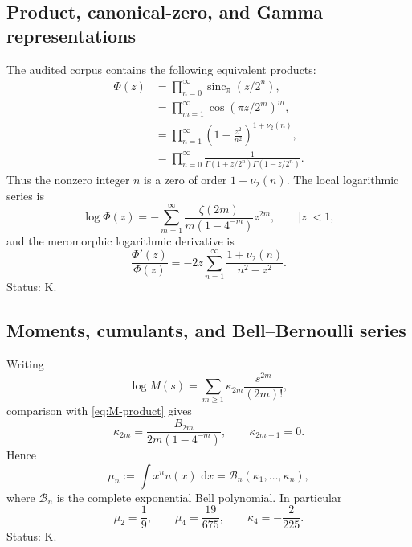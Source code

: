 \documentclass[11pt,oneside]{article}
\numberwithin{equation}{section}
\theoremstyle{definition}
\theoremstyle{remark}
\newcommand{\sincpi}{\operatorname{sinc}_{\pi}}
\newcommand{\vtwo}{\nu_2}
\newcommand{\dd}{\,\mathrm d}
\newcommand{\cB}{\mathcal B}
\newcommand{\statusknown}{\textcolor{deepviolet}{\textsf{K}}}
\begin{document}
\subsection{Product, canonical-zero, and Gamma representations}

The audited corpus contains the following equivalent products:
\begin{align}
 \Phi(z)
 &=\prod_{n=0}^{\infty}\sincpi(z/2^n),                     \label{eq:atlas-sinc}\\
 &=\prod_{m=1}^{\infty}\cos(\pi z/2^m)^m,                  \label{eq:atlas-cos}\\
 &=\prod_{n=1}^{\infty}\left(1-\frac{z^2}{n^2}\right)^{1+\vtwo(n)}, \label{eq:atlas-canonical}\\
 &=\prod_{n=0}^{\infty}
   \frac1{\Gamma(1+z/2^n)\Gamma(1-z/2^n)}.                \label{eq:atlas-gamma}
\end{align}
Thus the nonzero integer $n$ is a zero of order $1+\vtwo(n)$.  The local
logarithmic series is
\begin{equation}
 \log\Phi(z)=-\sum_{m=1}^{\infty}
 \frac{\zeta(2m)}{m(1-4^{-m})}z^{2m},\qquad |z|<1,          \label{eq:atlas-log-zeta}
\end{equation}
and the meromorphic logarithmic derivative is
\begin{equation}
 \frac{\Phi'(z)}{\Phi(z)}
 =-2z\sum_{n=1}^{\infty}\frac{1+\vtwo(n)}{n^2-z^2}.        \label{eq:atlas-log-derivative}
\end{equation}
Status: \statusknown.

\subsection{Moments, cumulants, and Bell--Bernoulli series}

Writing
\begin{equation}
 \log M(s)=\sum_{m\ge1}\kappa_{2m}\frac{s^{2m}}{(2m)!},    \label{eq:cumulant-def}
\end{equation}
comparison with \eqref{eq:M-product} gives
\begin{equation}
 \kappa_{2m}=\frac{B_{2m}}{2m(1-4^{-m})},
 \qquad \kappa_{2m+1}=0.                                  \label{eq:full-cumulants}
\end{equation}
Hence
\begin{equation}
 \mu_n:=\int x^n u(x)\,\dd x
 =\cB_n(\kappa_1,\ldots,\kappa_n),                         \label{eq:Bell-moments}
\end{equation}
where $\cB_n$ is the complete exponential Bell polynomial.  In particular
\begin{equation}
 \mu_2=\frac19,\qquad \mu_4=\frac{19}{675},\qquad
 \kappa_4=-\frac2{225}.                                   \label{eq:first-moments}
\end{equation}
Status: \statusknown.
\end{document}
